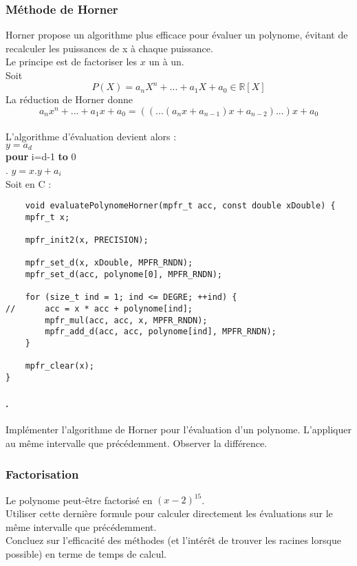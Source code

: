 \documentclass[a4paper,11pt]{exam}
\begin{document}
\subsubsection{Méthode de Horner}
\setcounter{enumii}{1}
Horner propose un algorithme plus efficace pour évaluer un polynome, évitant de recalculer les puissances de x à chaque puissance.
\\
Le principe est de factoriser les $x$ un à un. \\
Soit \[ P\left(X\right) = a_{n}X^{n}+...+a_{1}X +  a_{0} \in  \mathbb{R}\left[ X\right] \]
La réduction de Horner donne
\[a_{n}x^{n}+...+a_{1}x + a_{0} = ((...(a_{n}x+a_{n-1})x+a_{n-2})...)x+a_{0} \]
\\ 
L'algorithme d'évaluation devient alors :\\
	$y = a_{d}$\\
	\textbf{pour} i=d-1 \textbf{to} 0\\
	.\hspace{1cm} $y = x.y + a_{i}$
\\
Soit en C :
\begin{lstlisting}
	void evaluatePolynomeHorner(mpfr_t acc, const double xDouble) {
	mpfr_t x;

	mpfr_init2(x, PRECISION);

	mpfr_set_d(x, xDouble, MPFR_RNDN);
	mpfr_set_d(acc, polynome[0], MPFR_RNDN);

	for (size_t ind = 1; ind <= DEGRE; ++ind) {
//		acc = x * acc + polynome[ind];
		mpfr_mul(acc, acc, x, MPFR_RNDN);
		mpfr_add_d(acc, acc, polynome[ind], MPFR_RNDN);
	}

	mpfr_clear(x);
}
\end{lstlisting}

\paragraph{\theenumii.} Implémenter l'algorithme de Horner pour l'évaluation d'un polynome. L'appliquer au même intervalle que précédemment. Observer la différence.

\subsubsection{Factorisation} 
Le polynome peut-être factorisé en $(x-2)^{15}$.\\
Utiliser cette dernière formule pour calculer directement les évaluations sur le même intervalle que précédemment.\\
Concluez sur l'efficacité des méthodes (et l'intérêt de trouver les racines lorsque possible) en terme de temps de calcul.
\end{document}
